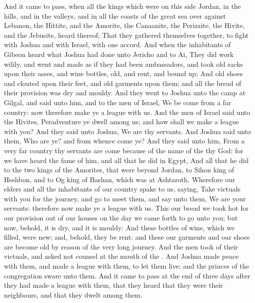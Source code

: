 \begin{biblechapter} %
 And it came to pass, when all the kings which were on this side Jordan, in the hills, and in the valleys, and in all the coasts of the great sea over against Lebanon, the Hittite, and the Amorite, the Canaanite, the Perizzite, the Hivite, and the Jebusite, heard thereof;
\verse That they gathered themselves together, to fight with Joshua and with Israel, with one accord.
\verse And when the inhabitants of Gibeon heard what Joshua had done unto Jericho and to Ai,
\verse They did work wilily, and went and made as if they had been ambassadors, and took old sacks upon their asses, and wine bottles, old, and rent, and bound up;
\verse And old shoes and clouted upon their feet, and old garments upon them; and all the bread of their provision was dry and mouldy.
\verse And they went to Joshua unto the camp at Gilgal, and said unto him, and to the men of Israel, We be come from a far country: now therefore make ye a league with us.
\verse And the men of Israel said unto the Hivites, Peradventure ye dwell among us; and how shall we make a league with you?
\verse And they said unto Joshua, We are thy servants. And Joshua said unto them, Who are ye? and from whence come ye?
\verse And they said unto him, From a very far country thy servants are come because of the name of the \LORD thy God: for we have heard the fame of him, and all that he did in Egypt,
\verse And all that he did to the two kings of the Amorites, that were beyond Jordan, to Sihon king of Heshbon, and to Og king of Bashan, which was at Ashtaroth.
\verse Wherefore our elders and all the inhabitants of our country spake to us, saying, Take victuals with you for the journey, and go to meet them, and say unto them, We are your servants: therefore now make ye a league with us.
\verse This our bread we took hot for our provision out of our houses on the day we came forth to go unto you; but now, behold, it is dry, and it is mouldy:
\verse And these bottles of wine, which we filled, were new; and, behold, they be rent: and these our garments and our shoes are become old by reason of the very long journey.
\verse And the men took of their victuals, and asked not counsel at the mouth of the \LORD.
\verse And Joshua made peace with them, and made a league with them, to let them live: and the princes of the congregation sware unto them.
\verse And it came to pass at the end of three days after they had made a league with them, that they heard that they were their neighbours, and that they dwelt among them.

\end{biblechapter}
